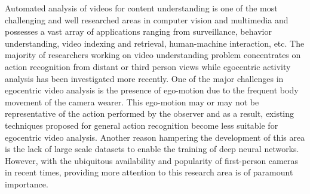 \documentclass{bmvc2k}
\newcommand{\rev}[2]{#2}
\begin{document}
Automated analysis of videos for content understanding is one of the most challenging and well researched areas in computer vision and multimedia and possesses a vast array of applications ranging from surveillance, behavior understanding, video indexing and retrieval, human-machine interaction, etc. The majority of researchers working on video understanding problem concentrates on action recognition from distant or third person views while egocentric activity analysis has been investigated \rev{only}{more} recently. One of the major challenges in egocentric video analysis is the presence of ego-motion due to the frequent body movement of the camera wearer. This ego-motion may or may not be \rev{a}{} representative of the action performed by the observer and as a result, existing techniques proposed for general action recognition become less suitable for egocentric video analysis. Another reason hampering the development of this area is the lack of large scale datasets to enable the training of deep neural networks. However, with the ubiquitous availability and popularity of first-person cameras in recent times, providing more attention to this research area is of paramount importance. 
\end{document}

